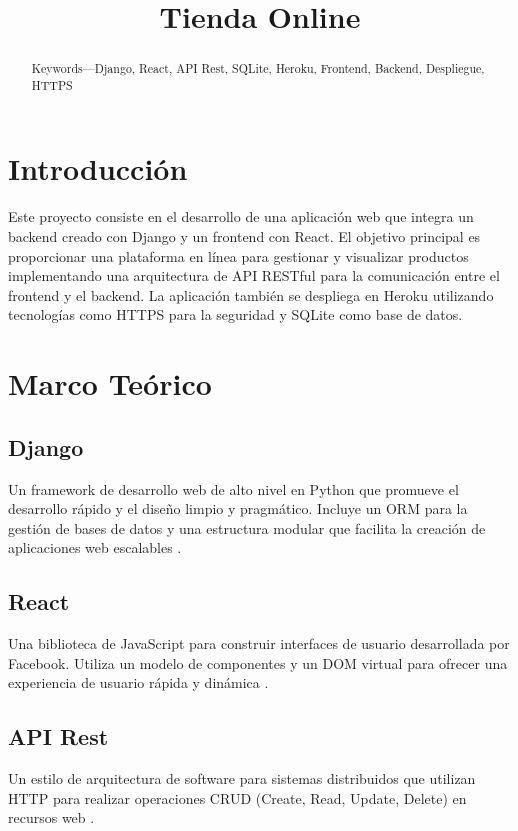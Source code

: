 \documentclass[conference]{IEEEtran}
\title{Tienda Online}
\author{%
  \IEEEauthorblockN{Llacma Quispe Kevin Andree}
  \IEEEauthorblockA{Universidad Nacional de San Agustín\\Arequipa, Perú\\
  Email: \texttt{kllacma@unsa.edu.pe}}
}
\date{}
\begin{document}
\maketitle

\begin{abstract}
Keywords—Django, React, API Rest, SQLite, Heroku, Frontend, Backend, Despliegue, HTTPS
\end{abstract}

\section{Introducción}
Este proyecto consiste en el desarrollo de una aplicación web que integra un backend creado con Django y un frontend con React. El objetivo principal es proporcionar una plataforma en línea para gestionar y visualizar productos implementando una arquitectura de API RESTful para la comunicación entre el frontend y el backend. La aplicación también se despliega en Heroku utilizando tecnologías como HTTPS para la seguridad y SQLite como base de datos.

\section{Marco Teórico}
\subsection{Django}
Un framework de desarrollo web de alto nivel en Python que promueve el desarrollo rápido y el diseño limpio y pragmático. Incluye un ORM para la gestión de bases de datos y una estructura modular que facilita la creación de aplicaciones web escalables \cite{django}.

\subsection{React}
Una biblioteca de JavaScript para construir interfaces de usuario desarrollada por Facebook. Utiliza un modelo de componentes y un DOM virtual para ofrecer una experiencia de usuario rápida y dinámica \cite{react}.

\subsection{API Rest}
Un estilo de arquitectura de software para sistemas distribuidos que utilizan HTTP para realizar operaciones CRUD (Create, Read, Update, Delete) en recursos web \cite{api_rest}.
\end{document}
